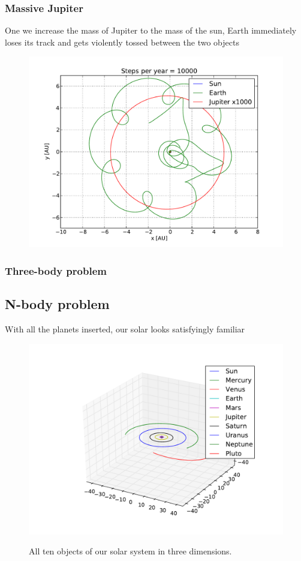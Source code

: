 \documentclass[10pt]{article}
\begin{document}
\begin{multicols}{2}
\subsubsection{Massive Jupiter}
One we increase the mass of Jupiter to the mass of the sun, Earth immediately loses its track and gets violently tossed between the two objects
\begin{figure}[H]
    \centering
    \includegraphics[width=1.0\linewidth]{../results/EJSx1000_1.pdf}
    \label{fig:name}
    \caption{}
\end{figure}

\subsubsection{Three-body problem}


\subsection{N-body problem}
With all the planets inserted, our solar looks satisfyingly familiar

\begin{figure}[H]
    \centering
    \includegraphics[width=1.0\linewidth]{../results/full_system.pdf}
    \label{fig:name}
    \caption{All ten objects of our solar system in three dimensions.}
\end{figure}


\end{multicols}
\end{document}
